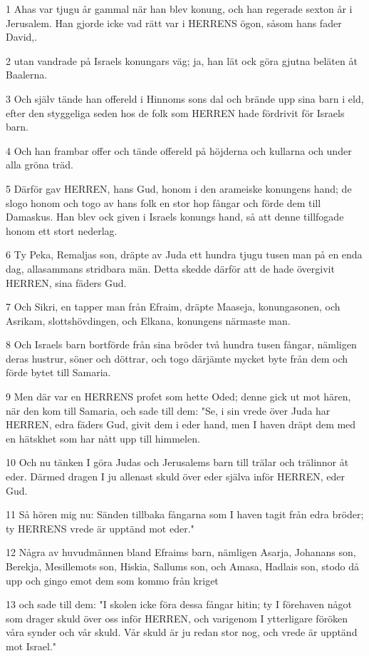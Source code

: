 \par 1 Ahas var tjugu år gammal när han blev konung, och han regerade sexton år i Jerusalem. Han gjorde icke vad rätt var i HERRENS ögon, såsom hans fader David,.
\par 2 utan vandrade på Israels konungars väg; ja, han lät ock göra gjutna beläten åt Baalerna.
\par 3 Och själv tände han offereld i Hinnoms sons dal och brände upp sina barn i eld, efter den styggeliga seden hos de folk som HERREN hade fördrivit för Israels barn.
\par 4 Och han frambar offer och tände offereld på höjderna och kullarna och under alla gröna träd.
\par 5 Därför gav HERREN, hans Gud, honom i den arameiske konungens hand; de slogo honom och togo av hans folk en stor hop fångar och förde dem till Damaskus. Han blev ock given i Israels konungs hand, så att denne tillfogade honom ett stort nederlag.
\par 6 Ty Peka, Remaljas son, dräpte av Juda ett hundra tjugu tusen man på en enda dag, allasammans stridbara män. Detta skedde därför att de hade övergivit HERREN, sina fäders Gud.
\par 7 Och Sikri, en tapper man från Efraim, dräpte Maaseja, konungasonen, och Asrikam, slottshövdingen, och Elkana, konungens närmaste man.
\par 8 Och Israels barn bortförde från sina bröder två hundra tusen fångar, nämligen deras hustrur, söner och döttrar, och togo därjämte mycket byte från dem och förde bytet till Samaria.
\par 9 Men där var en HERRENS profet som hette Oded; denne gick ut mot hären, när den kom till Samaria, och sade till dem: "Se, i sin vrede över Juda har HERREN, edra fäders Gud, givit dem i eder hand, men I haven dräpt dem med en hätskhet som har nått upp till himmelen.
\par 10 Och nu tänken I göra Judas och Jerusalems barn till trälar och trälinnor åt eder. Därmed dragen I ju allenast skuld över eder själva inför HERREN, eder Gud.
\par 11 Så hören mig nu: Sänden tillbaka fångarna som I haven tagit från edra bröder; ty HERRENS vrede är upptänd mot eder."
\par 12 Några av huvudmännen bland Efraims barn, nämligen Asarja, Johanans son, Berekja, Mesillemots son, Hiskia, Sallums son, och Amasa, Hadlais son, stodo då upp och gingo emot dem som kommo från kriget
\par 13 och sade till dem: "I skolen icke föra dessa fångar hitin; ty I förehaven något som drager skuld över oss inför HERREN, och varigenom I ytterligare föröken våra synder och vår skuld. Vår skuld är ju redan stor nog, och vrede är upptänd mot Israel."
